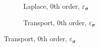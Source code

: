 \documentclass[a4paper,12pt]{amsart}
\numberwithin{equation}{section}
\def\bsigma{{\boldsymbol \sigma}}
\begin{document}
\begin{figure}[h!]
\centering
\begin{subfigure}[t]{0.49\textwidth}
	\caption{Laplace, 0th order, $\varepsilon_{\bsigma}$}
\end{subfigure}
	\hfill
\begin{subfigure}[t]{0.49\textwidth}
	\caption{Transport, 0th order, $\varepsilon_{\bsigma}$}
\end{subfigure}


\end{figure}
\end{document}
